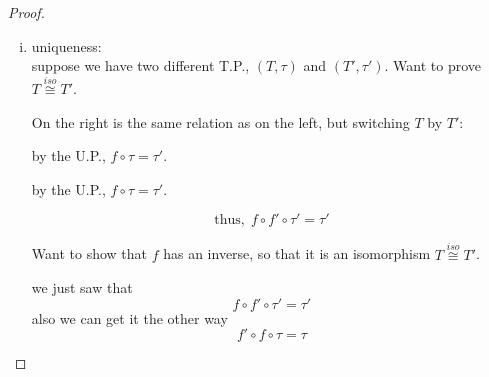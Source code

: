 \documentclass{article}
\theoremstyle{definition}
\begin{document}
\begin{proof}
  \begin{enumerate}[i.]
    \item uniqueness:\\

    suppose we have two different T.P., $(T, \tau)$ and $(T', \tau')$. Want to prove $T \stackrel{iso}{\cong} T'$.



    On the right is the same relation as on the left, but switching $T$ by $T'$:

  \begin{minipage}[t]{0.48\textwidth}
    \centering

    \vspace{0.5em}

    by the U.P., $f \circ \tau = \tau'$.
  \end{minipage}
  \hfill
  \begin{minipage}[t]{0.48\textwidth}
    \centering

    \vspace{0.5em}

    by the U.P., $f \circ \tau = \tau'$.
  \end{minipage}

  \vspace{0.3cm}
  $$\text{thus,}~~ f \circ f' \circ \tau' = \tau'$$

  Want to show that $f$ has an inverse, so that it is an isomorphism $T \stackrel{iso}{\cong} T'$.

  we just saw that
  $$f \circ f' \circ \tau' = \tau'$$
  also we can get it the other way
  $$f' \circ f \circ \tau = \tau$$


\end{enumerate}
\end{proof}
\end{document}
